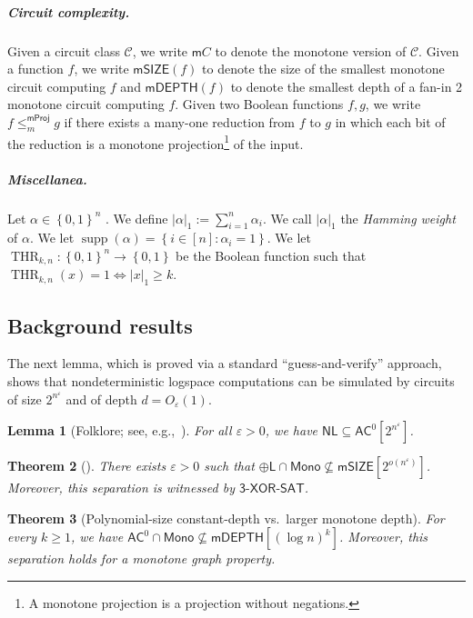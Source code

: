\documentclass[10pt,a4paper]{article}
\newtheorem{theorem}{Theorem}[section]
\newtheorem{lemma}[theorem]{Lemma}
\newcommand{\defx}[1]{\emph{#1}}
\newcommand{\eps}{\varepsilon}
\DeclareMathOperator{\supp}{supp}
\newcommand{\complexityfont}[1]{\mathsf{#1}}
\newcommand{\monclass}[1]{\mathsf{m}#1}
\newcommand\NL           {\complexityfont{NL}}
\def\AC           {\complexityfont{AC}}
\def\pL           {\oplus\complexityfont{L}}
\def\SIZE         {\complexityfont{SIZE}}
\def\DEPTH        {\complexityfont{DEPTH}}
\def\mSIZE        {\monclass{\SIZE}}
\def\mDEPTH       {\monclass{\DEPTH}}
\newcommand{\semMon}[1]{#1 \cap \monfns}
\newcommand{\monfns}{\mathsf{Mono}}
\newcommand{\txorsat}{\mathsf{3\mbox{-}XOR\mbox{-}SAT}}
\newcommand{\Cmon}[1]{\mathsf{mSIZE}({#1})}
\newcommand{\mdepth}[1]{\mathsf{mDEPTH}({#1})}
\def\sseq{\subseteq}
\newcommand{\set}[1]{\left\{#1\right\}}
\newcommand{\card}[1]{\lvert#1\rvert}
\newcommand{\hwt}[1]{\card{#1}_1}
\newcommand{\blt}{\set{0,1}}
\DeclareMathOperator{\thr}{THR}
\newcommand{\mprojred}{\leq^{\mathsf{mProj}}_m}
\def\calc{{\mathcal C}}
\begin{document}
\subparagraph{Circuit complexity.}

Given a circuit class $\calc$, we write
    $\monclass{C}$ to denote the
    monotone version of $\calc$.
Given a function $f$, we write $\Cmon{f}$
    to denote the size of the smallest monotone circuit computing
    $f$ and $\mdepth{f}$ to denote the smallest depth of a fan-in 2
    monotone circuit computing $f$.
Given two Boolean functions $f,g$, we write
$f \mprojred g$ if
there exists a many-one reduction from $f$ to $g$
in which each bit of the reduction is a monotone
projection\footnote{A monotone projection is a projection without
negations.}
of the input.

\subparagraph{Miscellanea.}

Let $\alpha \in \blt^n$ .
    We 
    define
    $\hwt{\alpha} := \sum_{i=1}^n \alpha_i$.
    We call $\card{\alpha}_1$ the \defx{Hamming weight} of $\alpha$.
    We let
    $\supp(\alpha) = \set{i \in [n] : \alpha_i = 1}$.
We let $\thr_{k,n} : \blt^n \to \blt$ be the Boolean function
    such that
    $\thr_{k,n}(x) = 1 \iff \hwt{x} \geq k$.



\subsection{Background results}


The next lemma, which is proved via a standard ``guess-and-verify''
approach, shows that nondeterministic logspace computations can be
simulated by circuits of size $2^{n^{\varepsilon}}$ and of depth $d =
O_\varepsilon(1)$.

\begin{lemma}[Folklore; see, e.g.,~{\cite[Lemma 8.1]{AHMPS08}}]
    \label{lemma:ac0_nc1_sim}
    For all $\eps > 0$, we have
    $\NL \sseq \AC^0[2^{n^\eps}]$.
\end{lemma}







\begin{theorem}[\cite{gkrs19}]
    \label{thm:xor-sat}
    There exists $\eps > 0$ 
    such that 
    $\semMon{\pL} \not\sseq \mSIZE[2^{o(n^{\eps})}]$.
    Moreover, 
    this separation is witnessed by $\txorsat$.
\end{theorem}

\begin{theorem}[Polynomial-size constant-depth vs.~larger monotone depth]
    \label{thm:ac0-fml-graph-intro}
    For every $k \geq 1$,
    we have
    $\semMon{\AC^0} \not\sseq \mDEPTH[(\log n)^k]$. Moreover, this separation holds for a monotone graph property.
\end{theorem}
\end{document}
